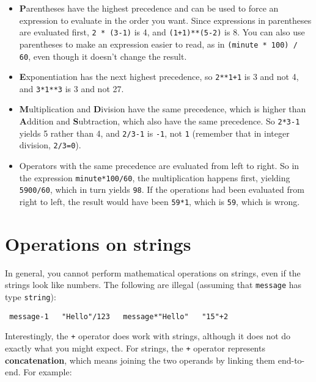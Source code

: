\begin{itemize}

\item {\bf P}arentheses have the highest precedence and can be used 
to force an expression to evaluate in the order you want. Since
expressions in parentheses are evaluated first, {\tt 2 * (3-1)} is 4,
and {\tt (1+1)**(5-2)} is 8. You can also use parentheses to make an
expression easier to read, as in {\tt (minute * 100) / 60}, even
though it doesn't change the result.

\item {\bf E}xponentiation has the next highest precedence, so
{\tt 2**1+1} is 3 and not 4, and {\tt 3*1**3} is 3 and not 27.

\item {\bf M}ultiplication and {\bf D}ivision have the same precedence,
which is higher than {\bf A}ddition and {\bf S}ubtraction, which also
have the same precedence.  So {\tt 2*3-1} yields 5 rather than 4, and
{\tt 2/3-1} is {\tt -1}, not {\tt 1} (remember that in integer
division, {\tt 2/3=0}).

\item Operators with the same precedence are evaluated from left to 
right.  So in the expression {\tt minute*100/60}, the multiplication
happens first, yielding {\tt 5900/60}, which in turn yields {\tt 98}.
If the operations had been evaluated from right to left, the result
would have been {\tt 59*1}, which is {\tt 59}, which is wrong.

\end{itemize}


\section{Operations on strings}

In general, you cannot perform mathematical operations on strings, even
if the strings look like numbers.  The following are illegal (assuming
that {\tt message} has type {\tt string}):

\beforeverb
\begin{verbatim}
 message-1   "Hello"/123   message*"Hello"   "15"+2
\end{verbatim}
\afterverb
%
Interestingly, the {\tt +} operator does work with strings, although it
does not do exactly what you might expect.  For strings, the {\tt +} operator
represents {\bf concatenation}, which means joining the two operands by
linking them end-to-end.  For example:

